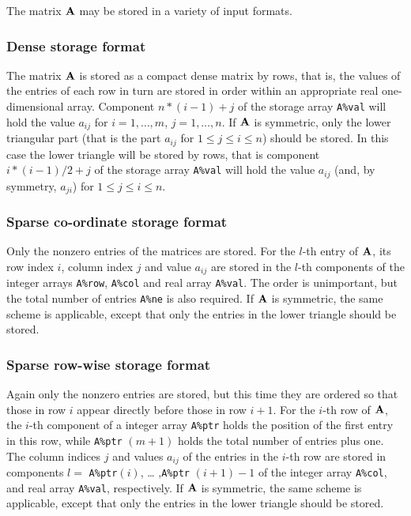 \documentclass{galahad}
\begin{document}

\galmatrix

The matrix ${\mathbf{A}}$ may be stored in a variety of input formats.

\subsubsection{Dense storage format}\label{dense}
The matrix ${\mathbf{A}}$ is stored as a compact
dense matrix by rows, that is, the values of the entries of each row in turn are
stored in order within an appropriate real one-dimensional array.
Component $n \ast (i-1) + j$ of the storage array {\tt A\%val} will hold the
value $a_{ij}$ for $i = 1, \ldots , m$, $j = 1, \ldots , n$.
If ${\mathbf{A}}$ is symmetric, only the lower triangular part (that is the part
$a_{ij}$ for $1 \leq j \leq i \leq n$) should be stored.  In this case
the lower triangle will be stored by rows, that is
component $i \ast (i-1)/2 + j$ of the storage array {\tt A\%val}
will hold the value $a_{ij}$ (and, by symmetry, $a_{ji}$)
for $1 \leq j \leq i \leq n$.

\subsubsection{Sparse co-ordinate storage format}\label{coordinate}
Only the nonzero entries of the matrices are stored. For the $l$-th
entry of ${\mathbf{A}}$, its row index $i$, column index $j$ and value
$a_{ij}$ are stored in the $l$-th components of the integer arrays
{\tt A\%row}, {\tt A\%col} and real array {\tt A\%val}.  The order is
unimportant, but the total number of entries {\tt A\%ne} is also
required.  If ${\mathbf{A}}$ is symmetric, the same scheme is applicable,
except that only the entries in the lower triangle should be stored.

\subsubsection{Sparse row-wise storage format}\label{rowwise}
Again only the nonzero entries are stored, but this time they are
ordered so that those in row $i$ appear directly before those in row
$i+1$. For the $i$-th row of ${\mathbf{A}}$, the $i$-th component of a integer
array {\tt A\%ptr} holds the position of the first entry in this row,
while {\tt A\%ptr} $(m+1)$ holds the total number of entries plus one.
The column indices $j$ and values $a_{ij}$ of the entries in the
$i$-th row are stored in components $l =$ {\tt A\%ptr}$(i)$, \ldots
,{\tt A\%ptr} $(i+1)-1$ of the integer array {\tt A\%col}, and real
array {\tt A\%val}, respectively.  If ${\mathbf{A}}$ is symmetric, the same
scheme is applicable, except that only the entries in the lower
triangle should be stored.
\end{document}
